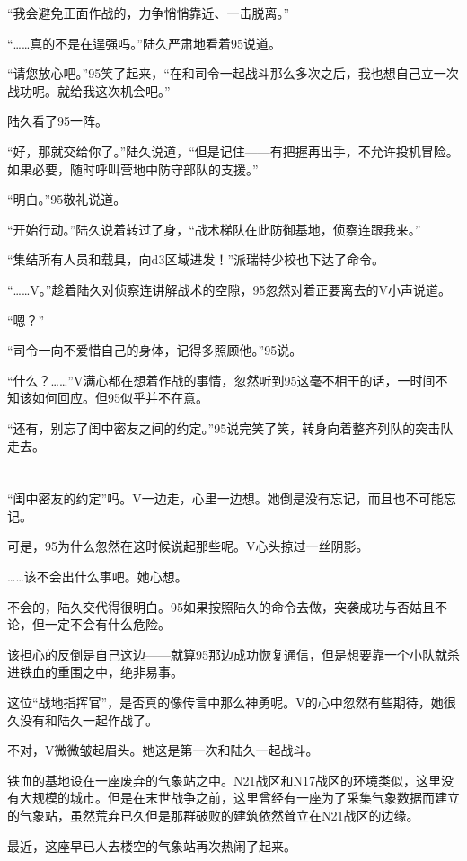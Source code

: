 “我会避免正面作战的，力争悄悄靠近、一击脱离。”

“……真的不是在逞强吗。”陆久严肃地看着95说道。

“请您放心吧。”95笑了起来，“在和司令一起战斗那么多次之后，我也想自己立一次战功呢。就给我这次机会吧。”

陆久看了95一阵。

“好，那就交给你了。”陆久说道，“但是记住——有把握再出手，不允许投机冒险。如果必要，随时呼叫营地中防守部队的支援。”

“明白。”95敬礼说道。

“开始行动。”陆久说着转过了身，“战术梯队在此防御基地，侦察连跟我来。”

“集结所有人员和载具，向d3区域进发！”派瑞特少校也下达了命令。

“……V。”趁着陆久对侦察连讲解战术的空隙，95忽然对着正要离去的V小声说道。

“嗯？”

“司令一向不爱惜自己的身体，记得多照顾他。”95说。

“什么？……”V满心都在想着作战的事情，忽然听到95这毫不相干的话，一时间不知该如何回应。但95似乎并不在意。

“还有，别忘了闺中密友之间的约定。”95说完笑了笑，转身向着整齐列队的突击队走去。

\section*{}

“闺中密友的约定”吗。V一边走，心里一边想。她倒是没有忘记，而且也不可能忘记。

可是，95为什么忽然在这时候说起那些呢。V心头掠过一丝阴影。

……该不会出什么事吧。她心想。

不会的，陆久交代得很明白。95如果按照陆久的命令去做，突袭成功与否姑且不论，但一定不会有什么危险。

该担心的反倒是自己这边——就算95那边成功恢复通信，但是想要靠一个小队就杀进铁血的重围之中，绝非易事。

这位“战地指挥官”，是否真的像传言中那么神勇呢。V的心中忽然有些期待，她很久没有和陆久一起作战了。

不对，V微微皱起眉头。她这是第一次和陆久一起战斗。

铁血的基地设在一座废弃的气象站之中。N21战区和N17战区的环境类似，这里没有大规模的城市。但是在末世战争之前，这里曾经有一座为了采集气象数据而建立的气象站，虽然荒弃已久但是那群破败的建筑依然耸立在N21战区的边缘。

最近，这座早已人去楼空的气象站再次热闹了起来。

